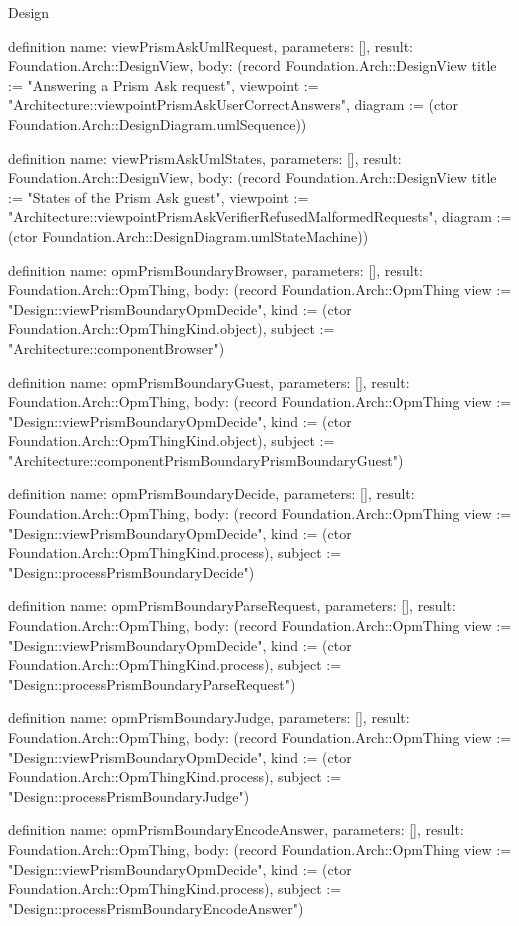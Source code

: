 \begin{lexlean}{Design}
\begin{semanticmodule}
definition{
  name: viewPrismAskUmlRequest,
  parameters: [],
  result: Foundation.Arch::DesignView,
  body: (record Foundation.Arch::DesignView {title := "Answering a Prism Ask request", viewpoint := "Architecture::viewpointPrismAskUserCorrectAnswers", diagram := (ctor Foundation.Arch::DesignDiagram.umlSequence)})
}

definition{
  name: viewPrismAskUmlStates,
  parameters: [],
  result: Foundation.Arch::DesignView,
  body: (record Foundation.Arch::DesignView {title := "States of the Prism Ask guest", viewpoint := "Architecture::viewpointPrismAskVerifierRefusedMalformedRequests", diagram := (ctor Foundation.Arch::DesignDiagram.umlStateMachine)})
}

definition{
  name: opmPrismBoundaryBrowser,
  parameters: [],
  result: Foundation.Arch::OpmThing,
  body: (record Foundation.Arch::OpmThing {view := "Design::viewPrismBoundaryOpmDecide", kind := (ctor Foundation.Arch::OpmThingKind.object), subject := "Architecture::componentBrowser"})
}

definition{
  name: opmPrismBoundaryGuest,
  parameters: [],
  result: Foundation.Arch::OpmThing,
  body: (record Foundation.Arch::OpmThing {view := "Design::viewPrismBoundaryOpmDecide", kind := (ctor Foundation.Arch::OpmThingKind.object), subject := "Architecture::componentPrismBoundaryPrismBoundaryGuest"})
}

definition{
  name: opmPrismBoundaryDecide,
  parameters: [],
  result: Foundation.Arch::OpmThing,
  body: (record Foundation.Arch::OpmThing {view := "Design::viewPrismBoundaryOpmDecide", kind := (ctor Foundation.Arch::OpmThingKind.process), subject := "Design::processPrismBoundaryDecide"})
}

definition{
  name: opmPrismBoundaryParseRequest,
  parameters: [],
  result: Foundation.Arch::OpmThing,
  body: (record Foundation.Arch::OpmThing {view := "Design::viewPrismBoundaryOpmDecide", kind := (ctor Foundation.Arch::OpmThingKind.process), subject := "Design::processPrismBoundaryParseRequest"})
}

definition{
  name: opmPrismBoundaryJudge,
  parameters: [],
  result: Foundation.Arch::OpmThing,
  body: (record Foundation.Arch::OpmThing {view := "Design::viewPrismBoundaryOpmDecide", kind := (ctor Foundation.Arch::OpmThingKind.process), subject := "Design::processPrismBoundaryJudge"})
}

definition{
  name: opmPrismBoundaryEncodeAnswer,
  parameters: [],
  result: Foundation.Arch::OpmThing,
  body: (record Foundation.Arch::OpmThing {view := "Design::viewPrismBoundaryOpmDecide", kind := (ctor Foundation.Arch::OpmThingKind.process), subject := "Design::processPrismBoundaryEncodeAnswer"})
}


\end{semanticmodule}
\end{lexlean}
